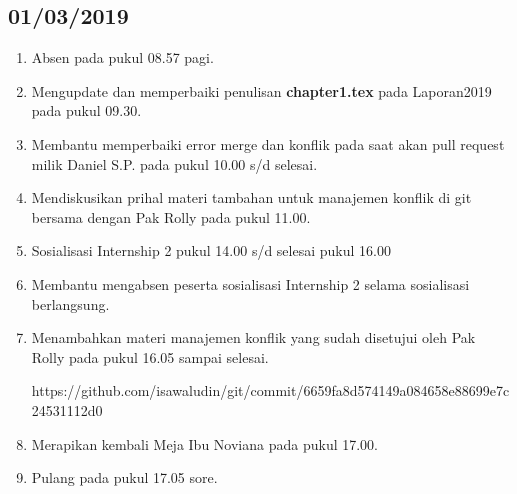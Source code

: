 \subsection{01/03/2019}
\begin{enumerate}
  \item Absen pada pukul 08.57 pagi.
  \item Mengupdate dan memperbaiki penulisan \textbf{chapter1.tex} pada Laporan2019 pada pukul 09.30.
  \item Membantu memperbaiki error merge dan konflik pada saat akan pull request milik Daniel S.P. pada pukul 10.00 s/d selesai.
  \item Mendiskusikan prihal materi tambahan untuk manajemen konflik di git bersama dengan Pak Rolly pada pukul 11.00.
  \item Sosialisasi Internship 2 pukul  14.00 s/d selesai pukul 16.00
  \item Membantu mengabsen peserta sosialisasi Internship 2 selama sosialisasi berlangsung.
  \item Menambahkan materi manajemen konflik yang sudah disetujui oleh Pak Rolly pada pukul 16.05 sampai selesai.
  \par https://github.com/isawaludin/git/commit/6659fa8d574149a084658e88699e7c24531112d0 
  \item Merapikan kembali Meja Ibu Noviana pada pukul 17.00.
  \item Pulang pada pukul 17.05 sore.
\end{enumerate}
